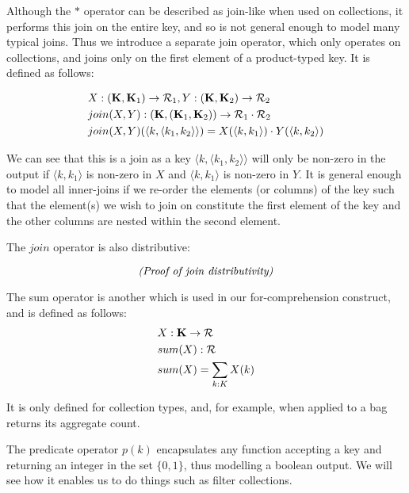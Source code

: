 {{{Although the $*$ operator can be described as join-like when used on collections, it performs this join on the entire key, and so is not general enough to model many typical joins. Thus we introduce a separate join operator, which only operates on collections, and joins only on the first element of a product-typed key. It is defined as follows:

\begin{equation*}
\begin{split}
& X: (\mathbf{K},\mathbf{K}_1) \rightarrow \mathcal{R}_1,  Y: (\mathbf{K},\mathbf{K}_2) \rightarrow \mathcal{R}_2 \\
& join(X, Y): (\mathbf{K}, (\mathbf{K}_1,\mathbf{K}_2)) \rightarrow \mathcal{R}_1 \cdot \mathcal{R}_2 \\
& join(X, Y)(\langle k, \langle k_1, k_2 \rangle \rangle) = X(\langle k, k_1 \rangle) \cdot Y(\langle k, k_2 \rangle)
\end{split}
\end{equation*}

We can see that this is a join as a key $\langle k, \langle k_1, k_2 \rangle \rangle$ will only be non-zero in the output if $\langle k, k_1 \rangle$ is non-zero in $X$ and $\langle k, k_1 \rangle$ is non-zero in $Y$. It is general enough to model all inner-joins if we re-order the elements (or columns) of the key such that the element(s) we wish to join on constitute the first element of the key and the other columns are nested within the second element. 

The $join$ operator is also distributive:

\begin{equation*}
\textrm{\textit{(Proof of join distributivity)}}
\end{equation*}

The sum operator is another which is used in our for-comprehension construct, and is defined as follows: 
\begin{equation*}
\begin{split}
 & X: \mathbf{K} \rightarrow \mathcal{R} \\
 & sum(X): \mathcal{R} \\
 & sum(X) = \sum_{k: K} X(k)
\end{split}
\end{equation*}
 
It is only defined for collection types, and, for example, when applied to a bag returns its aggregate count.
 
The predicate operator $p(k)$ encapsulates any function accepting a key and returning an integer in the set $\{0,1\}$, thus modelling a boolean output. We will see how it enables us to do things such as filter collections.
 
}}}
